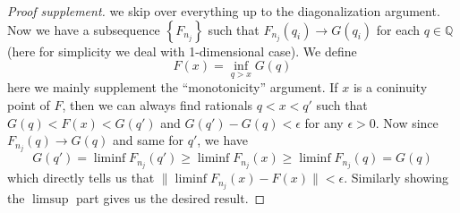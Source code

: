 \documentclass{article}
\begin{document}
\begin{proof}[Proof supplement] we skip over everything up to the diagonalization argument. Now we have a subsequence \( \left\{ F_{n_j} \right\}\) such that \(F_{n_j}(q_i) \to G(q_i)\) for each $q \in \mathbb{Q}$ (here for simplicity we deal with 1-dimensional case). We define 
\begin{equation}
    F(x) = \inf_{q > x} G(q)
\end{equation}
here we mainly supplement the ``monotonicity'' argument. If $x$ is a coninuity point of $F$, then we can always find rationals $q < x < q'$ such that $G(q) < F(x) < G(q')$ and $G(q') - G(q) < \epsilon$ for any $\epsilon > 0$. Now since $F_{n_j}(q) \to G(q)$ and same for $q'$, we have 
\begin{equation}
    G(q') = \liminf F_{n_j}(q') \geq \liminf F_{n_j}(x) \geq \liminf F_{n_j}(q) = G(q)
\end{equation}
which directly tells us that $\|\liminf F_{n_j}(x) - F(x)\| < \epsilon$. Similarly showing the $\limsup$ part gives us the desired result.
\end{proof}
\end{document}
